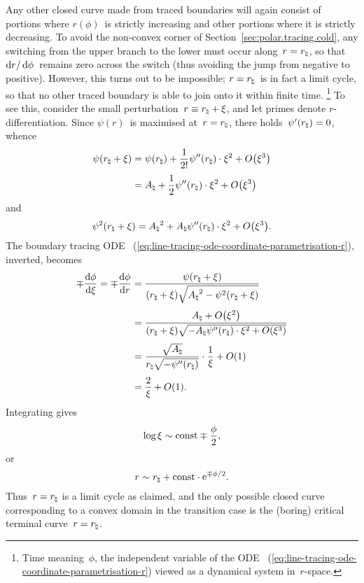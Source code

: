 Any other closed curve made from traced boundaries
will again consist of portions where $r (\phi)$~is strictly increasing
and other portions where it is strictly decreasing.
To avoid the non-convex corner of Section~\ref{sec:polar.tracing.cold},
any switching from the upper branch to the lower
must occur along~$r = r_\natural$,
so that $\mathop{}\!\mathrm{d} r / \mathop{}\!\mathrm{d}\phi$~remains zero across the switch
(thus avoiding the jump from negative to positive).
However, this turns out to be impossible;
$r = r_\natural$~is in fact a limit cycle,
so that no other traced boundary is able to join onto it
within finite time.%
\footnote{
  Time meaning~$\phi$,
  the independent variable of the ODE~%
    (\ref{eq:line-tracing-ode-coordinate-parametrisation-r})
  viewed as a dynamical system in~$r$-space.
}
To see this,
consider the small perturbation~$r \equiv r_\natural + \xi$,
and let primes denote $r$-differentiation.
Since $\psi (r)$~is maximised at~$r = r_\natural$,
there holds~$\psi' (r_\natural) = 0$, whence
\begin{align*}
  \psi (r_\nat + \xi)
  &=
    \psi (r_\nat) + \frac{1}{2!} \psi'' (r_\nat) \cdot \xi^2
    + \order \roundbr*{\xi^3}
      \\[\fraclinespace]
  &=
    A_\nat + \frac{1}{2} \psi'' (r_\nat) \cdot \xi^2
    + \order \roundbr*{\xi^3}
\end{align*}
and
\[
  \psi^2 (r_\nat + \xi) =
  {A_\nat}^2 + A_\nat \psi'' (r_\nat) \cdot \xi^2 + \order \roundbr*{\xi^3}.
\]
The boundary tracing ODE~%
  (\ref{eq:line-tracing-ode-coordinate-parametrisation-r}),
inverted,
becomes
\begin{align*}
  \mp \tder{\phi}{\xi} = \mp \tder{\phi}{r}
  &=
    \frac{
      \psi (r_\nat + \xi)
    }{
      (r_\nat + \xi) \sqrt{{A_\nat}^2 - \psi^2 (r_\nat + \xi)}
    }
    \\[\fraclinespace]
  &=
    \frac{
      A_\nat + \order \roundbr*{\xi^2}
    }{
      (r_\nat + \xi)
      \sqrt{
        -A_\nat \psi'' (r_\nat) \cdot \xi^2 + \order \roundbr*{\xi^3}
      }
    }
    \\[\fraclinespace]
  &=
    \frac{\sqrt{A_\nat}}{r_\nat \sqrt{-\psi'' (r_\nat)}}
      \cdot
    \frac{1}{\xi}
    + \order (1)
    \\[\fraclinespace]
  &=
    \frac{2}{\xi} + \order (1).
\end{align*}
Integrating gives
\[
  \log \xi \sim \mathrm{const} \mp \frac{\phi}{2},
\]
or
\begin{equation}
  r \sim r_\natural + \mathrm{const} \cdot \mathrm{e}^{\mp \phi / 2}.
  \label{eq:line-traced-boundary-transition-r-near-r-natural}
\end{equation}
Thus~$r = r_\natural$ is a limit cycle as claimed,
and the only possible closed curve corresponding to a convex domain
in the transition case
is the (boring) critical terminal curve~$r = r_\natural$.

